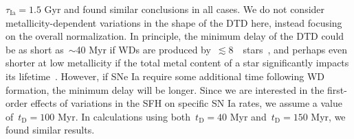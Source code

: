 \documentclass[foo.tex]{subfiles}
\begin{document}
$\tau_\text{Ia} = 1.5$ Gyr and found similar conclusions in all cases.
We do not consider metallicity-dependent variations in the shape of the DTD
here, instead focusing on the overall normalization.
In principle, the minimum delay of the DTD could be as short as~$\sim$40 Myr if
WDs are produced by~$\lesssim$8~\msun~stars~\citep*[e.g.,][]{Hurley2000}, and
perhaps even shorter at low metallicity if the total metal content of a star
significantly impacts its lifetime~\citep[e.g.,][]{Kodama1997, Vincenzo2016}.
However, if SNe Ia require some additional time following WD formation, the
minimum delay will be longer.
Since we are interested in the first-order effects of variations in the SFH on
specific SN Ia rates, we assume a value of~$t_\text{D} = 100$ Myr.
In calculations using both~$t_\text{D} = 40$ Myr and~$t_\text{D} = 150$ Myr,
we found similar results.
\par
\end{document}
